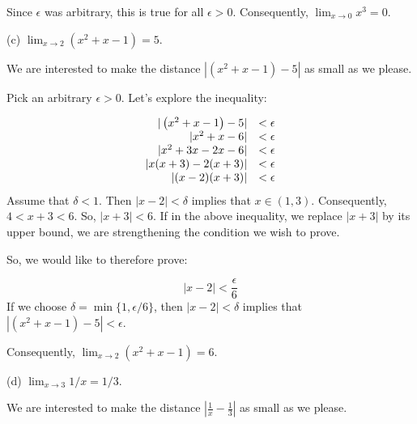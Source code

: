 \documentclass[10pt]{article}
\begin{document}
Since $\displaystyle \epsilon $ was arbitrary, this is true for all $\displaystyle \epsilon  >0$. Consequently, $\displaystyle \lim _{x\rightarrow 0} x^{3} =0$.



(c) $\displaystyle \lim _{x\rightarrow 2}\left( x^{2} +x-1\right) =5$.



We are interested to make the distance $\displaystyle |\left( x^{2} +x-1\right) -5|$ as small as we please. 



Pick an arbitrary $\displaystyle \epsilon  >0$. Let's explore the inequality:




\begin{equation*}
\begin{array}{ r l }
|\left( x^{2} +x-1\right) -5| & < \epsilon \\
|x^{2} +x-6| & < \epsilon \\
|x^{2} +3x-2x-6| & < \epsilon \\
|x( x+3) -2( x+3) | & < \epsilon \\
|( x-2)( x+3) | & < \epsilon 
\end{array}
\end{equation*}
Assume that $\displaystyle \delta < 1$. Then $\displaystyle |x-2|< \delta $ implies that $\displaystyle x\in ( 1,3)$. Consequently, $\displaystyle 4< x+3< 6$. So, $\displaystyle |x+3|< 6$. If in the above inequality, we replace $\displaystyle |x+3|$ by its upper bound, we are strengthening the condition we wish to prove. 



So, we would like to therefore prove:


\begin{equation*}
|x-2|< \frac{\epsilon }{6}
\end{equation*}
If we choose $\displaystyle \delta =\min\{1,\epsilon /6\}$, then $\displaystyle |x-2|< \delta $ implies that $\displaystyle |\left( x^{2} +x-1\right) -5|< \epsilon $.



Consequently, $\displaystyle \lim _{x\rightarrow 2}\left( x^{2} +x-1\right) =6$.



(d) $\displaystyle \lim _{x\rightarrow 3} 1/x=1/3$.



We are interested to make the distance $\displaystyle \left| \frac{1}{x} -\frac{1}{3}\right| $ as small as we please. 
\end{document}
